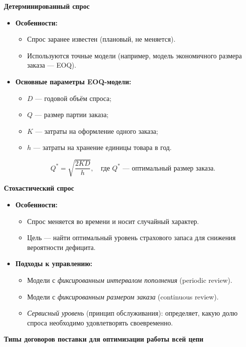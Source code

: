 \textbf{Детерминированный спрос}
\begin{itemize}
    \item \textbf{Особенности:}
    \begin{itemize}
        \item Спрос заранее известен (плановый, не меняется).
        \item Используются точные модели (например, модель экономичного размера заказа — EOQ).
    \end{itemize}
    \item \textbf{Основные параметры EOQ-модели:}
    \begin{itemize}
        \item $D$ — годовой объём спроса;
        \item $Q$ — размер партии заказа;
        \item $K$ — затраты на оформление одного заказа;
        \item $h$ — затраты на хранение единицы товара в год.
    \end{itemize}
    \[
        Q^* = \sqrt{\frac{2KD}{h}}, 
        \quad 
        \text{где } Q^* \text{ — оптимальный размер заказа.}
    \]
\end{itemize}

\textbf{Стохастический спрос}
\begin{itemize}
    \item \textbf{Особенности:}
    \begin{itemize}
        \item Спрос меняется во времени и носит случайный характер.
        \item Цель — найти оптимальный уровень страхового запаса для снижения вероятности дефицита.
    \end{itemize}
    \item \textbf{Подходы к управлению:}
    \begin{itemize}
        \item Модели с \textit{фиксированным интервалом пополнения} (periodic review).
        \item Модели с \textit{фиксированным размером заказа} (continuous review).
        \item \textit{Сервисный уровень} (принцип обслуживания): определяет, какую долю спроса необходимо удовлетворять своевременно.
    \end{itemize}
\end{itemize}

\textbf{Типы договоров поставки для оптимизации работы всей цепи}

